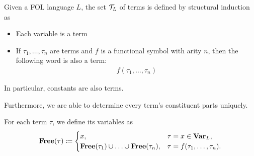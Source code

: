 \begin{definition}\label{def:first_order_term}\cite[20]{Lectures:logic_programming}
  Given a FOL language $L$, the set $\mathcal T_L$ of terms is defined by structural induction as
  \begin{itemize}
    \item Each variable is a term
    \item If $\tau_1, \ldots, \tau_n$ are terms and $f$ is a functional symbol with arity $n$, then the following word is also a term:
    \begin{align*}
      f(\tau_1, \ldots, \tau_n)
    \end{align*}
  \end{itemize}

  In particular, constants are also terms.

  Furthermore, we are able to determine every term's constituent parts uniquely.

  For each term $\tau$, we define its variables as
  \begin{align*}
    \operatorname{\mathbf{Free}}(\tau) \coloneqq \begin{cases}
      x,                                                        &\tau = x \in \operatorname{\mathbf{Var}}_L, \\
      \operatorname{\mathbf{Free}}(\tau_1) \cup \ldots \cup \operatorname{\mathbf{Free}}(\tau_n), &\tau = f(\tau_1, \ldots, \tau_n).
    \end{cases}
  \end{align*}
\end{definition}

